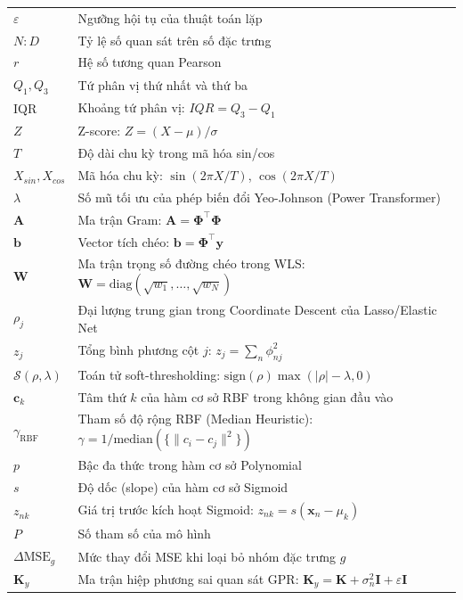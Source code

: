 \documentclass[oneside]{styles/hcmus-report}
\begin{document}
\begin{longtable}{p{} p{}}
$\varepsilon$ & Ngưỡng hội tụ của thuật toán lặp \\
$N:D$           & Tỷ lệ số quan sát trên số đặc trưng \\
$r$             & Hệ số tương quan Pearson \\
$Q_1, Q_3$      & Tứ phân vị thứ nhất và thứ ba \\
IQR             & Khoảng tứ phân vị: $IQR = Q_3 - Q_1$ \\
$Z$             & Z-score: $Z = (X - \mu)/\sigma$ \\
$T$             & Độ dài chu kỳ trong mã hóa sin/cos \\
$X_{sin}, X_{cos}$ & Mã hóa chu kỳ: $\sin(2\pi X/T)$, $\cos(2\pi X/T)$ \\
$\lambda$       & Số mũ tối ưu của phép biến đổi Yeo-Johnson (Power Transformer) \\
$\mathbf{A}$            & Ma trận Gram: $\mathbf{A} = \boldsymbol{\Phi}^\top\boldsymbol{\Phi}$ \\
$\mathbf{b}$            & Vector tích chéo: $\mathbf{b} = \boldsymbol{\Phi}^\top\mathbf{y}$ \\
$\mathbf{W}$            & Ma trận trọng số đường chéo trong WLS: $\mathbf{W} = \mathrm{diag}(\sqrt{w_1},\ldots,\sqrt{w_N})$ \\
$\rho_j$                & Đại lượng trung gian trong Coordinate Descent của Lasso/Elastic Net \\
$z_j$                   & Tổng bình phương cột $j$: $z_j = \sum_n \phi_{nj}^2$ \\
$\mathcal{S}(\rho,\lambda)$ & Toán tử soft-thresholding: $\mathrm{sign}(\rho)\max(|\rho|-\lambda,0)$ \\
$\boldsymbol{c}_k$      & Tâm thứ $k$ của hàm cơ sở RBF trong không gian đầu vào \\
$\gamma_{\text{RBF}}$   & Tham số độ rộng RBF (Median Heuristic): $\gamma = 1/\mathrm{median}(\{\|c_i-c_j\|^2\})$ \\
$p$                     & Bậc đa thức trong hàm cơ sở Polynomial \\
$s$                     & Độ dốc (slope) của hàm cơ sở Sigmoid \\
$z_{nk}$                & Giá trị trước kích hoạt Sigmoid: $z_{nk} = s(\mathbf{x}_n - \mu_k)$ \\
$P$                     & Số tham số của mô hình \\
$\Delta\mathrm{MSE}_g$  & Mức thay đổi MSE khi loại bỏ nhóm đặc trưng $g$ \\
$\mathbf{K}_y$          & Ma trận hiệp phương sai quan sát GPR: $\mathbf{K}_y = \mathbf{K} + \sigma_n^2\mathbf{I} + \varepsilon\mathbf{I}$ \\

\end{longtable}
\end{document}

